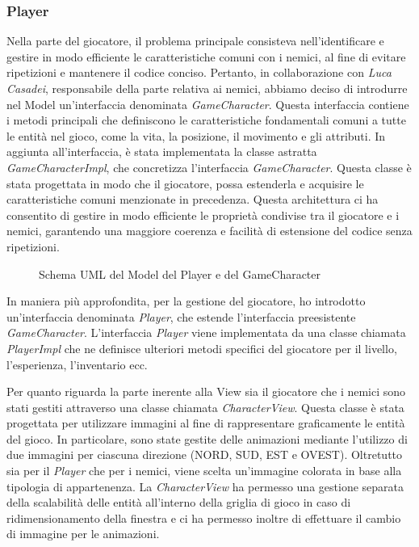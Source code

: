 \documentclass[a4paper,12pt]{report}
\begin{document}
\subsubsection{Player}
Nella parte del giocatore, il problema principale consisteva nell'identificare e gestire in modo efficiente le caratteristiche comuni con i nemici, al fine di evitare ripetizioni e mantenere il codice conciso. 
Pertanto, in collaborazione con \textit{Luca Casadei}, responsabile della parte relativa ai nemici, abbiamo deciso di introdurre nel Model un'interfaccia denominata \textit{GameCharacter}. Questa interfaccia contiene i metodi principali che definiscono le caratteristiche fondamentali comuni a tutte le entità nel gioco, come la vita, la posizione, il movimento e gli attributi.
In aggiunta all'interfaccia, è stata implementata la classe astratta \textit{GameCharacterImpl}, che concretizza l'interfaccia \textit{GameCharacter}. Questa classe è stata progettata in modo che il giocatore, possa estenderla e acquisire le caratteristiche comuni menzionate in precedenza. Questa architettura ci ha consentito di gestire in modo efficiente le proprietà condivise tra il giocatore e i nemici, garantendo una maggiore coerenza e facilità di estensione del codice senza ripetizioni.

\begin{figure}[H]
	\centering
	
	\caption{Schema UML del Model del Player e del GameCharacter}
	\label{fig:the-exiled-player-uml}
\end{figure}

In maniera più approfondita, per la gestione del giocatore, ho introdotto un'interfaccia denominata \textit{Player}, che estende l'interfaccia preesistente \textit{GameCharacter}. 
L'interfaccia \textit{Player} viene implementata da una classe chiamata \textit{PlayerImpl} che ne definisce ulteriori metodi specifici del giocatore per il livello, l'esperienza, l'inventario ecc. 

Per quanto riguarda la parte inerente alla View sia il giocatore che i nemici sono stati gestiti attraverso una classe chiamata \textit{CharacterView}. Questa classe è stata progettata per utilizzare immagini al fine di rappresentare graficamente le entità del gioco. In particolare, sono state gestite delle animazioni mediante l'utilizzo di due immagini per ciascuna direzione (NORD, SUD, EST e OVEST). Oltretutto sia per il \textit{Player} che per i nemici, viene scelta un'immagine colorata in base alla tipologia di appartenenza. La \textit{CharacterView} ha permesso una gestione separata della scalabilità delle entità all'interno della griglia di gioco in caso di ridimensionamento della finestra e ci ha permesso inoltre di effettuare il cambio di immagine per le animazioni.
\end{document}
